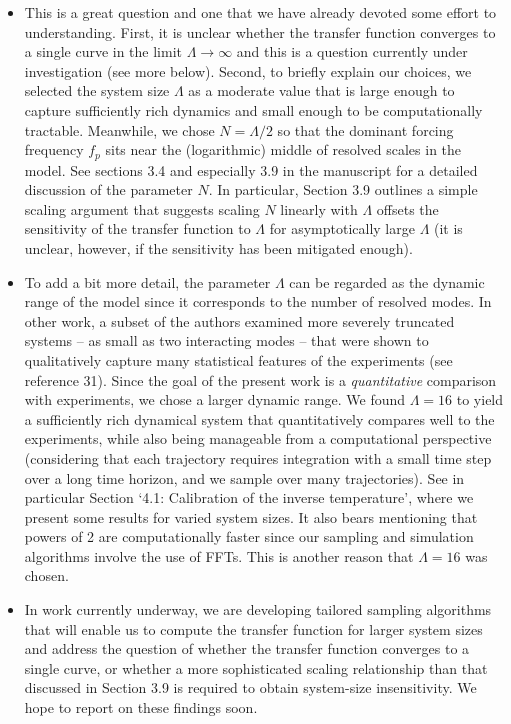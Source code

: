 \documentclass[11pt]{article}
\begin{document}
\begin{itemize}
\item This is a great question and one that we have already devoted some effort to understanding. First, it is unclear whether the transfer function converges to a single curve in the limit $\Lambda \to \infty$ and this is a question currently under investigation (see more below). Second, to briefly explain our choices, we selected the system size $\Lambda$ as a moderate value that is large enough to capture sufficiently rich dynamics and small enough to be computationally tractable. Meanwhile, we chose $N = \Lambda / 2$ so that the dominant forcing frequency $f_p$ sits near the (logarithmic) middle of resolved scales in the model. See sections 3.4 and especially 3.9 in the manuscript for a detailed discussion of the parameter $N$. In particular, Section 3.9 outlines a simple scaling argument that suggests scaling $N$ linearly with $\Lambda$ offsets the sensitivity of the transfer function to $\Lambda$ for asymptotically large $\Lambda$ (it is unclear, however, if the sensitivity has been mitigated enough).

\item To add a bit more detail, the parameter $\Lambda$ can be regarded as the dynamic range of the model since it corresponds to the number of resolved modes. In other work, a subset of the authors examined more severely truncated systems -- as small as two interacting modes -- that were shown to qualitatively capture many statistical features of the experiments (see reference 31). Since the goal of the present work is a {\em quantitative} comparison with experiments, we chose a larger dynamic range. We found $\Lambda = 16$ to yield a sufficiently rich dynamical system that quantitatively compares well to the experiments, while also being manageable from a computational perspective (considering that each trajectory requires integration with a small time step over a long time horizon, and we sample over many trajectories). See in particular Section `4.1: Calibration of the inverse temperature', where we present some results for varied system sizes. It also bears mentioning that powers of 2 are computationally faster since our sampling and simulation algorithms involve the use of FFTs. This is another reason that $\Lambda = 16$ was chosen.
	
\item In  work currently underway, we are developing tailored sampling algorithms that will enable us to compute the transfer function for larger system sizes and address the question of whether the transfer function converges to a single curve, or whether a more sophisticated scaling relationship than that discussed in Section 3.9 is required to obtain system-size insensitivity. We hope to report on these findings soon.


\end{itemize}
\end{document}
